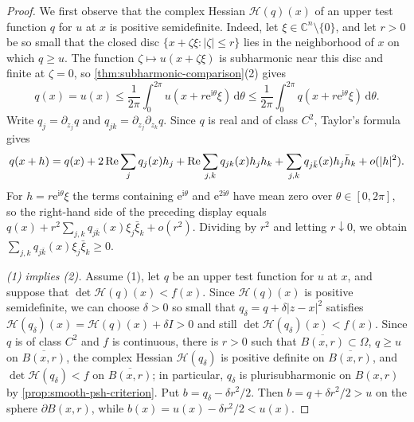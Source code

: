 \begin{proof}
We first observe that the complex Hessian $\mathcal H(q)(x)$ of an upper test function $q$ for $u$ at $x$ is positive semidefinite. Indeed, let $\xi\in\mathbb C^n\setminus\{0\}$, and let $r>0$ be so small that the closed disc $\{x+\zeta\xi:|\zeta|\le r\}$ lies in the neighborhood of $x$ on which $q\ge u$. The function $\zeta\mapsto u(x+\zeta\xi)$ is subharmonic near this disc and finite at $\zeta=0$, so \cref{thm:subharmonic-comparison}(2) gives
\[
 q(x)=u(x)\le\frac1{2\pi}\int_0^{2\pi}u(x+r\mathrm e^{\mathrm i\theta}\xi)\,\mathrm d\theta\le\frac1{2\pi}\int_0^{2\pi}q(x+r\mathrm e^{\mathrm i\theta}\xi)\,\mathrm d\theta.
\]
Write $q_j=\partial_{z_j}q$ and $q_{jk}=\partial_{z_j}\partial_{z_k}q$. Since $q$ is real and of class $C^2$, Taylor's formula gives
\[
 q(x+h)=q(x)+2\operatorname{Re}\sum_jq_j(x)h_j+\operatorname{Re}\sum_{j,k}q_{jk}(x)h_jh_k+\sum_{j,k}q_{j\bar k}(x)h_j\bar h_k+o(|h|^2).
\]
For $h=r\mathrm e^{\mathrm i\theta}\xi$ the terms containing $\mathrm e^{\mathrm i\theta}$ and $\mathrm e^{2\mathrm i\theta}$ have mean zero over $\theta\in[0,2\pi]$, so the right-hand side of the preceding display equals $q(x)+r^2\sum_{j,k}q_{j\bar k}(x)\xi_j\bar\xi_k+o(r^2)$. Dividing by $r^2$ and letting $r\downarrow0$, we obtain $\sum_{j,k}q_{j\bar k}(x)\xi_j\bar\xi_k\ge0$.

\emph{(1) implies (2).} Assume (1), let $q$ be an upper test function for $u$ at $x$, and suppose that $\det\mathcal H(q)(x)<f(x)$. Since $\mathcal H(q)(x)$ is positive semidefinite, we can choose $\delta>0$ so small that $q_\delta=q+\delta|z-x|^2$ satisfies $\mathcal H(q_\delta)(x)=\mathcal H(q)(x)+\delta I>0$ and still $\det\mathcal H(q_\delta)(x)<f(x)$. Since $q$ is of class $C^2$ and $f$ is continuous, there is $r>0$ such that $\overline{B(x,r)}\subset\Omega$, $q\ge u$ on $\overline{B(x,r)}$, the complex Hessian $\mathcal H(q_\delta)$ is positive definite on $\overline{B(x,r)}$, and $\det\mathcal H(q_\delta)<f$ on $\overline{B(x,r)}$; in particular, $q_\delta$ is plurisubharmonic on $B(x,r)$ by \cref{prop:smooth-psh-criterion}. Put $b=q_\delta-\delta r^2/2$. Then $b=q+\delta r^2/2>u$ on the sphere $\partial B(x,r)$, while $b(x)=u(x)-\delta r^2/2<u(x)$.


\end{proof}

